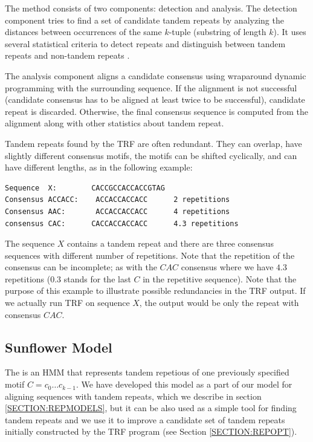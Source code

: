 The method consists of two components: detection and analysis. The detection
component tries to find a set of candidate tandem repeats by analyzing the
distances between occurrences of the same $k$-tuple (substring of length $k$).
It uses several statistical criteria to detect repeats and distinguish between
tandem repeats and non-tandem repeats \cite{Benson1999}.

The analysis component aligns a candidate consensus using wraparound dynamic
programming \cite{Myers1989} with the surrounding sequence. If the alignment is
not successful (candidate consensus has to be aligned at least twice to be
successful), candidate repeat is discarded. Otherwise, the final consensus
sequence is computed from the alignment along with other statistics about
tandem repeat.

Tandem repeats found by the TRF are often redundant.  They can overlap, have slightly
different consensus motifs, the motifs can be shifted cyclically, and can have
different lengths, as in the following example:

\begin{verbatim}
Sequence  X:        CACCGCCACCACCGTAG
Consensus ACCACC:    ACCACCACCACC      2 repetitions
Consensus AAC:       ACCACCACCACC      4 repetitions
consensus CAC:      CACCACCACCACC      4.3 repetitions
\end{verbatim}

The sequence $X$ contains a tandem repeat and there are three consensus
sequences with different number of repetitions. Note that the repetition of the
consensus can be incomplete; as with the $CAC$ consensus where we have $4.3$
repetitions ($0.3$ stands for the last $C$ in the repetitive sequence).  Note
that the purpose of this example to illustrate possible redundancies in the TRF
output.  If we actually run TRF on sequence $X$, the output would be only the
repeat with consensus $CAC$.

\subsection{Sunflower Model}\label{SECTION:SUNFLOWERMODEL}
The  is an HMM that represents tandem repetious of
one previously specified motif $C=c_0\dots c_{k-1}$. We have developed this
model as a part of our model for aligning sequences with tandem repeats, which
we describe in section \ref{SECTION:REPMODELS}, but it can be also used as a
simple tool for finding tandem repeats and we use it to improve a candidate set
of tandem repeats initially constructed by the TRF program (see Section
\ref{SECTION:REPOPT}).

